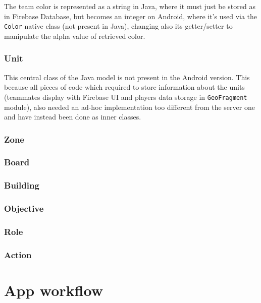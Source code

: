 				The team color is represented as a string in Java, where it must just be stored as in Firebase Database, but becomes an integer on Android, where it's used via the \lstinline|Color| native class (not present in Java), changing also its getter/setter to manipulate the alpha value of retrieved color.
			
			\subsubsection{Unit}
			
				This central class of the Java model is not present in the Android version. This because all pieces of code which required to store information about the units (teammates display with Firebase UI and players data storage in \lstinline|GeoFragment| module), also needed an ad-hoc implementation too different from the server one and have instead been done as inner classes.
			
			\subsubsection{Zone}
			
			\subsubsection{Board}
			
			\subsubsection{Building}
			
			\subsubsection{Objective}
			
			\subsubsection{Role}
			
			\subsubsection{Action}
			
	\section{App workflow}\label{app:workflow}
	
